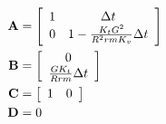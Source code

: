 \begin{align}
  \mathbf{A} &= \left[
  \begin{array}{cc}
    1 & \Delta t \\
    0 & 1 - \frac{K_t G^2}{R^2rmK_v} \Delta t
  \end{array}
  \right] \\
  \mathbf{B} &= \left[
  \begin{array}{c}
    0 \\
    \frac{GK_t}{Rrm} \Delta t
  \end{array}
  \right] \\
  \mathbf{C} &= \left[
  \begin{array}{cc}
    1 & 0
  \end{array}
  \right] \\
  \mathbf{D} &= 0
\end{align}
